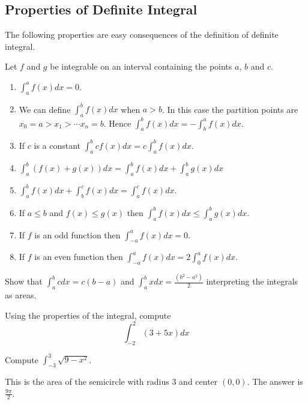 \documentclass[calc1-main.tex]{subfiles}
\begin{document}
\subsection*{Properties of Definite Integral}
The following properties are easy consequences of the definition of definite integral.
\begin{theorem}
  Let $f$ and $g$ be integrable on an interval containing the points $a$, $b$ and $c$.
  \begin{enumerate}
    \item $\displaystyle \int_a^a f(x) dx = 0$.

    \item We can define $\int_a^b f(x) dx$ when $a>b$. In this case the partition points are $x_0 = a > x_1 > \cdots x_n = b$. Hence $\displaystyle \int_a^b f(x) dx = - \int_b^a f(x) dx$.

    \item If $c$ is a constant $\displaystyle \int_a^b c f(x) dx = c \int_a^b f(x)dx$.

    \item $\displaystyle \int_a^b (f(x) + g(x)) dx = \int_a^b f(x) dx + \int_a^b g(x)dx$

    \item $\displaystyle \int_a^b f(x) dx + \int_b^c f(x) dx = \int_a^c f(x) dx.$

    \item If $a \le b$ and $f(x) \le g(x)$ then $\displaystyle \int_a^b f(x) dx \le \int_a^b g(x) dx$.

    \item If $f$ is an odd function then $\displaystyle \int_{-a}^a f(x) dx = 0$.

    \item If $f$ is an even function then $\displaystyle \int_{-a}^a f(x) dx = 2 \int_0^a f(x) dx$.
  \end{enumerate}
\end{theorem}

\begin{example}
  Show that $\int_{a}^b c dx =c(b-a)$ and $\int_a^b x dx = \frac{(b^2 - a^2)}{2}$ interpreting the integrals as areas.
\end{example}

\begin{example}
  Using the properties of the integral, compute
  \[
    \int_{-2}^2 (3+5x) dx
  \]
\end{example}

\begin{example}
  Compute $\int_{-3}^3 \sqrt{9 - x^2}$.
\end{example}
\begin{solution}
  This is the area of the semicircle with radius $3$ and center $(0,0)$. The answer is $\frac{9 \pi}{2}$.
\end{solution}
\end{document}
